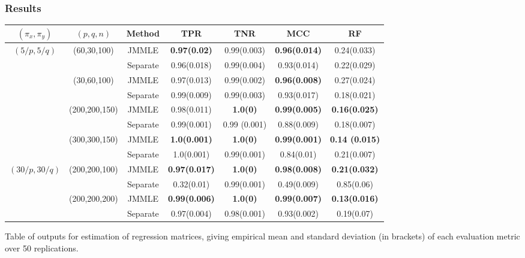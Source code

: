 \documentclass[10pt]{beamer}
\theoremstyle{definition}
\begin{document}
\begin{frame}
\frametitle{Results}

\begin{scriptsize}
\begin{tabular}{ccccccc}
\hline
    $(\pi_x, \pi_y)$ & $(p,q,n)$   & Method   & TPR            & TNR            & MCC & RF            \\ \hline
    $(5/p, 5/q)$   & (60,30,100)   & JMMLE    & \textbf{0.97(0.02)}  & 0.99(0.003)  & \textbf{0.96(0.014)} & 0.24(0.033) \\
    ~              & ~             & Separate & 0.96(0.018) & 0.99(0.004)  & 0.93(0.014) & 0.22(0.029) \\\cline{2-7}
    ~              & (30,60,100)   & JMMLE    & 0.97(0.013) & 0.99(0.002)  & \textbf{0.96(0.008)} & 0.27(0.024) \\
    ~              & ~             & Separate & 0.99(0.009) & 0.99(0.003)  & 0.93(0.017) & 0.18(0.021) \\\cline{2-7}
    ~              & (200,200,150) & JMMLE    & 0.98(0.011) & \textbf{1.0(0) }      & \textbf{0.99(0.005)} & \textbf{0.16(0.025)} \\
    ~              & ~             & Separate & 0.99(0.001) & 0.99 (0.001) & 0.88(0.009) & 0.18(0.007) \\\cline{2-7}
    ~              & (300,300,150) & JMMLE    & \textbf{1.0(0.001)}  & \textbf{1.0(0)}       & \textbf{0.99(0.001)} & \textbf{0.14 (0.015)}\\
    ~              & ~             & Separate & 1.0(0.001)  & 0.99(0.001)  & 0.84(0.01)  & 0.21(0.007)\\\hline
    $(30/p, 30/q)$ & (200,200,100) & JMMLE    & \textbf{0.97(0.017)} & \textbf{1.0(0)}       & \textbf{0.98(0.008)} & \textbf{0.21(0.032)} \\
    ~              & ~             & Separate & 0.32(0.01)  & 0.99(0.001)  & 0.49(0.009) & 0.85(0.06)  \\\cline{2-7}
    ~              & (200,200,200) & JMMLE    & \textbf{0.99(0.006)} & \textbf{1.0(0)}       & \textbf{0.99(0.007)} & \textbf{0.13(0.016)} \\
    ~              & ~             & Separate & 0.97(0.004) & 0.98(0.001)  & 0.93(0.002) & 0.19(0.07)  \\    \hline
\end{tabular}

\begin{center}
Table of outputs for estimation of regression matrices, giving empirical mean and standard deviation (in brackets) of each evaluation metric over 50 replications.
\end{center}
\end{scriptsize}

\end{frame}
\end{document}
